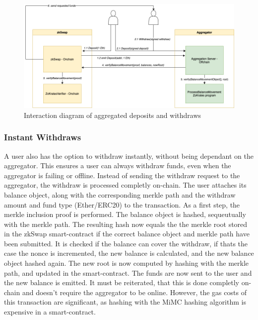 \documentclass[../../thesis.tex]{subfiles}
\begin{document}
\begin{figure}[h]
    \centerline{\includegraphics[totalheight=8cm]{diagrams/depWith.png}}
    \caption{Interaction diagram of aggregated deposits and withdraws}
    \label{fig:depWith}
\end{figure}

\subsubsection{Instant Withdraws}
A user also has the option to withdraw instantly, without being dependant on the aggregator. This ensures a user can always withdraw funds, even when the aggregator is failing or offline. Instead of sending the withdraw request to the aggregator, the withdraw is processed completly on-chain. The user attaches its balance object, along with the corresponding merkle path and the withdraw amount and fund type (Ether/ERC20) to the transaction. As a first step, the merkle inclusion proof is performed. The balance object is hashed, sequeutually with the merkle path. The resulting hash now equals the the merkle root stored in the zkSwap smart-contract if the correct balance object and merkle path have been submitted. It is checked if the balance can cover the withdraw, if thats the case the nonce is incremented, the new balance is calculated, and the new balance object hashed again. The new root is now computed by hashing with the merkle path, and updated in the smart-contract. The funds are now sent to the user and the new balance is emitted. It must be reiterated, that this is done completly on-chain and doesn't require the aggregator to be online. However, the gas costs of this transaction are significant, as hashing with the MiMC hashing algorithm is expensive in a smart-contract.
\end{document}
